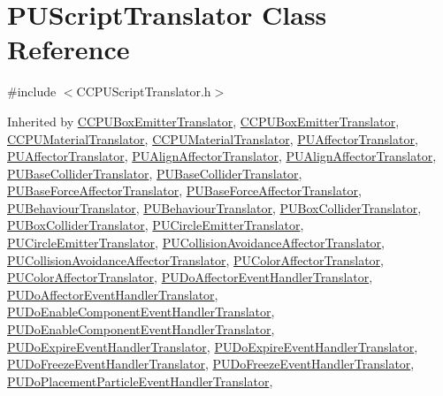 \hypertarget{classPUScriptTranslator}{}\section{P\+U\+Script\+Translator Class Reference}
\label{classPUScriptTranslator}


{\ttfamily \#include $<$C\+C\+P\+U\+Script\+Translator.\+h$>$}



Inherited by \hyperlink{classCCPUBoxEmitterTranslator}{C\+C\+P\+U\+Box\+Emitter\+Translator}, \hyperlink{classCCPUBoxEmitterTranslator}{C\+C\+P\+U\+Box\+Emitter\+Translator}, \hyperlink{classCCPUMaterialTranslator}{C\+C\+P\+U\+Material\+Translator}, \hyperlink{classCCPUMaterialTranslator}{C\+C\+P\+U\+Material\+Translator}, \hyperlink{classPUAffectorTranslator}{P\+U\+Affector\+Translator}, \hyperlink{classPUAffectorTranslator}{P\+U\+Affector\+Translator}, \hyperlink{classPUAlignAffectorTranslator}{P\+U\+Align\+Affector\+Translator}, \hyperlink{classPUAlignAffectorTranslator}{P\+U\+Align\+Affector\+Translator}, \hyperlink{classPUBaseColliderTranslator}{P\+U\+Base\+Collider\+Translator}, \hyperlink{classPUBaseColliderTranslator}{P\+U\+Base\+Collider\+Translator}, \hyperlink{classPUBaseForceAffectorTranslator}{P\+U\+Base\+Force\+Affector\+Translator}, \hyperlink{classPUBaseForceAffectorTranslator}{P\+U\+Base\+Force\+Affector\+Translator}, \hyperlink{classPUBehaviourTranslator}{P\+U\+Behaviour\+Translator}, \hyperlink{classPUBehaviourTranslator}{P\+U\+Behaviour\+Translator}, \hyperlink{classPUBoxColliderTranslator}{P\+U\+Box\+Collider\+Translator}, \hyperlink{classPUBoxColliderTranslator}{P\+U\+Box\+Collider\+Translator}, \hyperlink{classPUCircleEmitterTranslator}{P\+U\+Circle\+Emitter\+Translator}, \hyperlink{classPUCircleEmitterTranslator}{P\+U\+Circle\+Emitter\+Translator}, \hyperlink{classPUCollisionAvoidanceAffectorTranslator}{P\+U\+Collision\+Avoidance\+Affector\+Translator}, \hyperlink{classPUCollisionAvoidanceAffectorTranslator}{P\+U\+Collision\+Avoidance\+Affector\+Translator}, \hyperlink{classPUColorAffectorTranslator}{P\+U\+Color\+Affector\+Translator}, \hyperlink{classPUColorAffectorTranslator}{P\+U\+Color\+Affector\+Translator}, \hyperlink{classPUDoAffectorEventHandlerTranslator}{P\+U\+Do\+Affector\+Event\+Handler\+Translator}, \hyperlink{classPUDoAffectorEventHandlerTranslator}{P\+U\+Do\+Affector\+Event\+Handler\+Translator}, \hyperlink{classPUDoEnableComponentEventHandlerTranslator}{P\+U\+Do\+Enable\+Component\+Event\+Handler\+Translator}, \hyperlink{classPUDoEnableComponentEventHandlerTranslator}{P\+U\+Do\+Enable\+Component\+Event\+Handler\+Translator}, \hyperlink{classPUDoExpireEventHandlerTranslator}{P\+U\+Do\+Expire\+Event\+Handler\+Translator}, \hyperlink{classPUDoExpireEventHandlerTranslator}{P\+U\+Do\+Expire\+Event\+Handler\+Translator}, \hyperlink{classPUDoFreezeEventHandlerTranslator}{P\+U\+Do\+Freeze\+Event\+Handler\+Translator}, \hyperlink{classPUDoFreezeEventHandlerTranslator}{P\+U\+Do\+Freeze\+Event\+Handler\+Translator}, \hyperlink{classPUDoPlacementParticleEventHandlerTranslator}{P\+U\+Do\+Placement\+Particle\+Event\+Handler\+Translator}, 